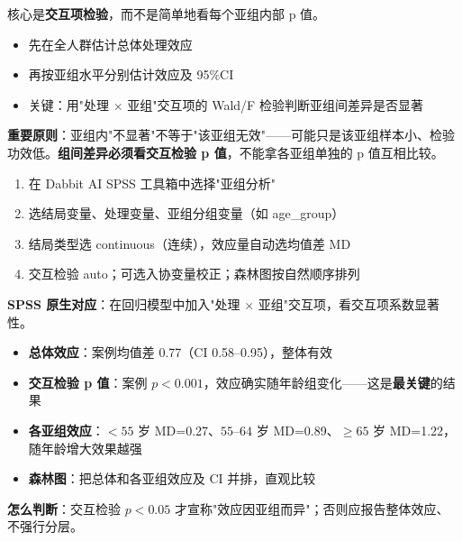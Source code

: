\begin{algoprinciple}
核心是\textbf{交互项检验}，而不是简单地看每个亚组内部 p 值。

\begin{itemize}
    \item 先在全人群估计总体处理效应
    \item 再按亚组水平分别估计效应及 95\%CI
    \item 关键：用"处理 $\times$ 亚组"交互项的 Wald/F 检验判断亚组间差异是否显著
\end{itemize}

\textbf{重要原则}：亚组内"不显著"不等于"该亚组无效"——可能只是该亚组样本小、检验功效低。\textbf{组间差异必须看交互检验 p 值}，不能拿各亚组单独的 p 值互相比较。
\end{algoprinciple}

\begin{algosposs}
\begin{enumerate}
    \item 在 Dabbit AI SPSS 工具箱中选择"亚组分析"
    \item 选结局变量、处理变量、亚组分组变量（如 age\_group）
    \item 结局类型选 continuous（连续），效应量自动选均值差 MD
    \item 交互检验 auto；可选入协变量校正；森林图按自然顺序排列
\end{enumerate}

\textbf{SPSS 原生对应}：在回归模型中加入"处理 $\times$ 亚组"交互项，看交互项系数显著性。
\end{algosposs}

\begin{algoresult}
\begin{itemize}
    \item \textbf{总体效应}：案例均值差 0.77（CI 0.58--0.95），整体有效
    \item \textbf{交互检验 p 值}：案例 $p<0.001$，效应确实随年龄组变化——这是\textbf{最关键}的结果
    \item \textbf{各亚组效应}：$<55$ 岁 MD=0.27、$55$--$64$ 岁 MD=0.89、$\geq 65$ 岁 MD=1.22，随年龄增大效果越强
    \item \textbf{森林图}：把总体和各亚组效应及 CI 并排，直观比较
\end{itemize}

\textbf{怎么判断}：交互检验 $p<0.05$ 才宣称"效应因亚组而异"；否则应报告整体效应、不强行分层。
\end{algoresult}

